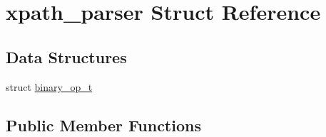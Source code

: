 \hypertarget{structxpath__parser}{\section{xpath\-\_\-parser Struct Reference}
\label{structxpath__parser}
}
\subsection*{Data Structures}
\begin{DoxyCompactItemize}
\item 
struct \hyperlink{structxpath__parser_1_1binary__op__t}{binary\-\_\-op\-\_\-t}
\end{DoxyCompactItemize}
\subsection*{Public Member Functions}

